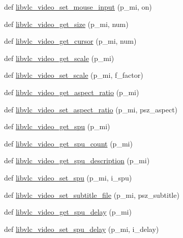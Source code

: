 \begin{DoxyCompactItemize}
def \hyperlink{namespacesrc_1_1lib_1_1vlc_a2008bc33c068a5e50fcfa29a3060cd67}{libvlc\+\_\+video\+\_\+set\+\_\+mouse\+\_\+input} (p\+\_\+mi, on)
\item 
def \hyperlink{namespacesrc_1_1lib_1_1vlc_a0e524a1a623158ab1837b74c5f9b2693}{libvlc\+\_\+video\+\_\+get\+\_\+size} (p\+\_\+mi, num)
\item 
def \hyperlink{namespacesrc_1_1lib_1_1vlc_aa4c794f4a5169a86b6e31cc29241b5ce}{libvlc\+\_\+video\+\_\+get\+\_\+cursor} (p\+\_\+mi, num)
\item 
def \hyperlink{namespacesrc_1_1lib_1_1vlc_a53859e6fcfb1562aa7fd6e4fd5f49e5b}{libvlc\+\_\+video\+\_\+get\+\_\+scale} (p\+\_\+mi)
\item 
def \hyperlink{namespacesrc_1_1lib_1_1vlc_a9b96b5bdce0a3cf3b18148344e8269b4}{libvlc\+\_\+video\+\_\+set\+\_\+scale} (p\+\_\+mi, f\+\_\+factor)
\item 
def \hyperlink{namespacesrc_1_1lib_1_1vlc_a6727c1cdd96470ac2d037393f9835f11}{libvlc\+\_\+video\+\_\+get\+\_\+aspect\+\_\+ratio} (p\+\_\+mi)
\item 
def \hyperlink{namespacesrc_1_1lib_1_1vlc_a00e719508b590d096c4cf978f7c5a2dd}{libvlc\+\_\+video\+\_\+set\+\_\+aspect\+\_\+ratio} (p\+\_\+mi, psz\+\_\+aspect)
\item 
def \hyperlink{namespacesrc_1_1lib_1_1vlc_a649b12059e10b2e0deedc528752bdec7}{libvlc\+\_\+video\+\_\+get\+\_\+spu} (p\+\_\+mi)
\item 
def \hyperlink{namespacesrc_1_1lib_1_1vlc_acfa5109d025b3ac745472739cc377540}{libvlc\+\_\+video\+\_\+get\+\_\+spu\+\_\+count} (p\+\_\+mi)
\item 
def \hyperlink{namespacesrc_1_1lib_1_1vlc_a529738c763d2e6a0ee316436fd98708b}{libvlc\+\_\+video\+\_\+get\+\_\+spu\+\_\+description} (p\+\_\+mi)
\item 
def \hyperlink{namespacesrc_1_1lib_1_1vlc_a7ae1dd7fd5b6f00b242f7da33a9c27d6}{libvlc\+\_\+video\+\_\+set\+\_\+spu} (p\+\_\+mi, i\+\_\+spu)
\item 
def \hyperlink{namespacesrc_1_1lib_1_1vlc_a8f2f9cd608a82fb2e546d701d6074041}{libvlc\+\_\+video\+\_\+set\+\_\+subtitle\+\_\+file} (p\+\_\+mi, psz\+\_\+subtitle)
\item 
def \hyperlink{namespacesrc_1_1lib_1_1vlc_a16cb627500c264831489c2a96273d448}{libvlc\+\_\+video\+\_\+get\+\_\+spu\+\_\+delay} (p\+\_\+mi)
\item 
def \hyperlink{namespacesrc_1_1lib_1_1vlc_ade9fbc380c57c8d09d705a269aa48822}{libvlc\+\_\+video\+\_\+set\+\_\+spu\+\_\+delay} (p\+\_\+mi, i\+\_\+delay)
\item 

\end{DoxyCompactItemize}
